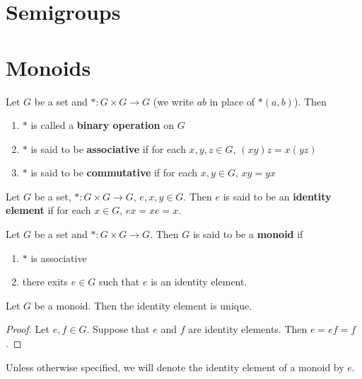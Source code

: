 \documentclass{book}
\begin{document}
	\section{Semigroups}
	
	
	
	\newpage
	\section{Monoids}
	
	\begin{defn}
		Let $G$ be a set and $*: G \times G \rightarrow G$ (we write $ab$ in place of $*(a,b)$). Then 
		\begin{enumerate}
			\item $*$ is called a \textbf{binary operation} on $G$	
			\item $*$ is said to be \textbf{associative}	if for each $x,y,z \in G$, $(xy)z = x(yz)$
			\item $*$ is said to be \textbf{commutative} if for each $x,y \in G$, $xy = yx$ 
		\end{enumerate}
	\end{defn}
	
	\begin{defn}
		Let $G$ be a set, $*: G \times G \rightarrow G$, $e,x,y \in G$. Then $e$ is said to be an \textbf{identity element} if for each $x \in G$, $ex = xe = x$.
	\end{defn}
	
	\begin{defn}
		Let $G$ be a set and $*: G \times G \rightarrow G$. Then $G$ is said to be a \textbf{monoid} if 
		\begin{enumerate}
			\item $*$ is associative
			\item there exits $e \in G$ such that $e$ is an identity element.
		\end{enumerate}
	\end{defn}	
	
	\begin{ex}
		Let $G$ be a monoid. Then the identity element is unique.
	\end{ex}
	
	\begin{proof}
		Let $e, f \in G$. Suppose that $e$ and $f$ are identity elements. Then $e = ef = f$.
	\end{proof}
	
	\begin{note}
		Unless otherwise specified, we will denote the identity element of a monoid by $e$.
	\end{note}
	
\end{document}
